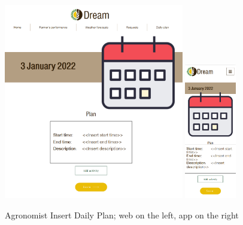 \documentclass{article}
\begin{document}
        \begin{figure} [h]
            \centering
            \includegraphics[width=0.7\textwidth]{images/UserInterfaces/Agronomist/DailyPlan/InsertWeb.png}
            \quad
            \includegraphics[width=0.2\textwidth]{images/UserInterfaces/Agronomist/DailyPlan/InsertApp.png}
            \quad
            \caption{\label{fig:agronomistDPInsert}Agronomist Insert Daily Plan; web on the left, app on the right}
        \end{figure}
        \newpage
\end{document}
